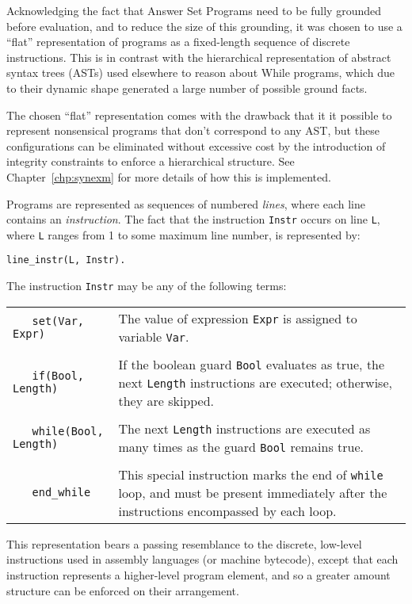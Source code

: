 \documentclass[a4paper,twoside,notitlepage]{report}
\begin{document}
Acknowledging the fact that Answer Set Programs need to be fully grounded 
before evaluation, and to reduce the size of this grounding, it was chosen 
to use a ``flat'' representation of programs as a fixed-length sequence of 
discrete instructions. This is in contrast with the hierarchical 
representation of abstract syntax trees (ASTs) used elsewhere to reason 
about While programs, which due to their dynamic shape generated a large 
number of possible ground facts.

The chosen ``flat'' representation comes with the drawback that it it 
possible to represent nonsensical programs that don't correspond to any 
AST, but these configurations can be eliminated without excessive cost by 
the introduction of integrity constraints to enforce a hierarchical 
structure. See Chapter~\ref{chp:synexm} for more details of how this is 
implemented.

Programs are represented as sequences of numbered \emph{lines}, where each 
line contains an \emph{instruction}. The fact that the instruction 
\verb|Instr| occurs on line \verb|L|, where \verb|L| ranges from 1 to some 
maximum line number, is represented by:
\begin{Verbatim}[samepage=true]
    line_instr(L, Instr).
\end{Verbatim}

The instruction \verb|Instr| may be any of the following terms:

\begin{tabularx}{\textwidth}{lX}
    \verb|   set(Var, Expr)|
&   The value of expression \verb|Expr| is assigned to variable \verb|Var|.
\\
\\  \verb|   if(Bool, Length)|
&   If the boolean guard \verb|Bool| evaluates as true, the next \verb|Length|
    instructions are executed; otherwise, they are skipped.
\\
\\  \verb|   while(Bool, Length)|
&   The next \verb|Length| instructions are executed as many times as the 
    guard \verb|Bool| remains true.
\\
\\  \verb|   end_while|
&   This special instruction marks the end of \verb|while| loop, and must 
    be present immediately after the instructions encompassed by each loop.
\end{tabularx}

This representation bears a passing resemblance to the discrete, low-level 
instructions used in assembly languages (or machine bytecode), except that 
each instruction represents a higher-level program element, and so a greater 
amount structure can be enforced on their arrangement.
\end{document}
